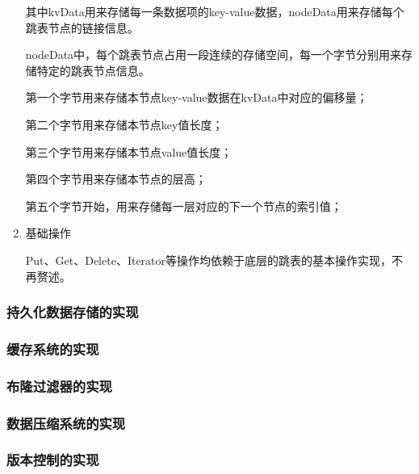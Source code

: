 \begin{enumerate}
			
			其中kvData用来存储每一条数据项的key-value数据，nodeData用来存储每个跳表节点的链接信息。

			nodeData中，每个跳表节点占用一段连续的存储空间，每一个字节分别用来存储特定的跳表节点信息。

			第一个字节用来存储本节点key-value数据在kvData中对应的偏移量；
			
			第二个字节用来存储本节点key值长度；
			
			第三个字节用来存储本节点value值长度；
			
			第四个字节用来存储本节点的层高；
			
			第五个字节开始，用来存储每一层对应的下一个节点的索引值；

		\item 基础操作
		
		Put、Get、Delete、Iterator等操作均依赖于底层的跳表的基本操作实现，不再赘述。
		\end{enumerate}

		\subsubsection{持久化数据存储的实现}


		\subsubsection{缓存系统的实现}


		\subsubsection{布隆过滤器的实现}

		\subsubsection{数据压缩系统的实现}

		\subsubsection{版本控制的实现}

	